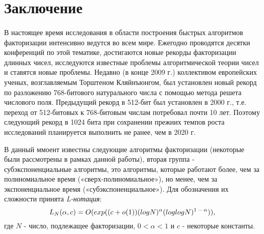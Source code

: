   
\section{Заключение}

\paragraph{} В настоящее время исследования в области построения быстрых алгоритмов факторизации интенсивно ведутся во всем мире. Ежегодно 
  проводятся десятки конференций по этой тематике, достигаются новые рекорды факторизации длинных чисел, исследуются известные проблемы 
  алгоритмической теории чисел и ставятся новые проблемы. Недавно (в конце 2009 г.) коллективом европейских ученых, возглавляемым Торштеном
  Кляйнъюнгом, был установлен новый рекорд по разложению 768-битового натурального числа с помощью метода решета числового поля. Предыдущий
  рекорд в 512-бит был установлен в 2000 г., т.е. переход от 512-битовых к 768-битовым числам потребовал почти 10 лет. Поэтому следующий 
  рекорд в 1024 бита при сохранении прежних темпов роста исследований планируется выполнить не ранее, чем в 2020 г.
  
  В данный ммоент известны следующие алгоритмы факторизации (некоторые были рассмотрены в рамках данной работы),
  вторая группа - субэкспоненциальные алгоритмы, это алгоритмы, которые работают более, чем за полиномиальное время («сверх-полиномиальное»),
  но менее, чем за экспоненциальное время («субэкспоненциальное»). Для обозначения их сложности принята \textit{L-нотация}:  
    \begin{equation} \label{eq:prime-fact-lnc}
     L_N(\alpha,c)=O(exp((c+o(1))(logN)^\alpha(loglogN)\textsuperscript{{$1-\alpha$}})), 
    \end{equation}    
  где {$N$} - число, подлежащее факторизации, {$0 < \alpha < 1$}  и {$c$} - некоторые константы.
  
